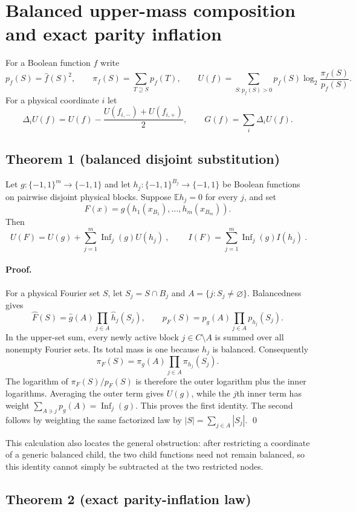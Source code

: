 \section*{Balanced upper-mass composition and exact parity inflation}

For a Boolean function $f$ write
\[
 p_f(S)=\widehat f(S)^2,\qquad
 \pi_f(S)=\sum_{T\supseteq S}p_f(T),\qquad
 U(f)=\sum_{S:p_f(S)>0}p_f(S)\log_2\frac{\pi_f(S)}{p_f(S)}.
\]
For a physical coordinate $i$ let
\[
 \Delta_iU(f)=U(f)-\frac{U(f_{i,-})+U(f_{i,+})}{2},
 \qquad G(f)=\sum_i\Delta_iU(f).
\]

\subsection*{Theorem 1 (balanced disjoint substitution)}

Let $g:\{-1,1\}^m\to\{-1,1\}$ and let
$h_j:\{-1,1\}^{B_j}\to\{-1,1\}$ be Boolean functions on pairwise
disjoint physical blocks.  Suppose $\mathbb E h_j=0$ for every $j$, and set
\[
 F(x)=g(h_1(x_{B_1}),\ldots,h_m(x_{B_m})).
\]
Then
\[
 \boxed{\ U(F)=U(g)+\sum_{j=1}^m\operatorname{Inf}_j(g)U(h_j)\ },
 \qquad
 \boxed{\ I(F)=\sum_{j=1}^m\operatorname{Inf}_j(g)I(h_j)\ }.
\]

\paragraph{Proof.}
For a physical Fourier set $S$, let $S_j=S\cap B_j$ and
$A=\{j:S_j\ne\varnothing\}$.  Balancedness gives
\[
 \widehat F(S)=\widehat g(A)\prod_{j\in A}\widehat h_j(S_j),
 \qquad
 p_F(S)=p_g(A)\prod_{j\in A}p_{h_j}(S_j).
\]
In the upper-set sum, every newly active block $j\in C\setminus A$ is
summed over all nonempty Fourier sets.  Its total mass is one because
$h_j$ is balanced.  Consequently
\[
 \pi_F(S)=\pi_g(A)\prod_{j\in A}\pi_{h_j}(S_j).
\]
The logarithm of $\pi_F(S)/p_F(S)$ is therefore the outer logarithm plus
the inner logarithms.  Averaging the outer term gives $U(g)$, while the
$j$th inner term has weight
$\sum_{A\ni j}p_g(A)=\operatorname{Inf}_j(g)$.  This proves the first
identity.  The second follows by weighting the same factorized law by
$|S|=\sum_{j\in A}|S_j|$. \qed

This calculation also locates the general obstruction: after restricting
a coordinate of a generic balanced child, the two child functions need not
remain balanced, so this identity cannot simply be subtracted at the two
restricted nodes.

\subsection*{Theorem 2 (exact parity-inflation law)}


